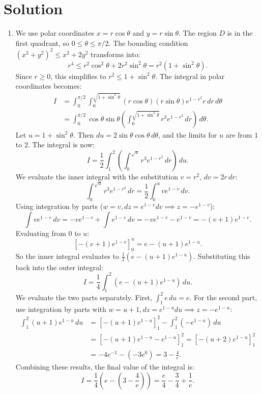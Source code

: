 \documentclass{article}
\begin{document}
\section*{Solution}
\begin{enumerate}[label=\fbox{\arabic*}]
  \item %
        We use polar coordinates $x = r \cos \theta$ and $y = r \sin \theta$. 
        The region $D$ is in the first quadrant, so $0 \le \theta \le \pi/2$.
        The bounding condition $(x^2 + y^2)^2 \le x^2 + 2y^2$ transforms into:
        \[
          r^4 \le r^2 \cos^2 \theta + 2r^2 \sin^2 \theta = r^2 (1 + \sin^2 \theta).
        \]
        Since $r \ge 0$, this simplifies to $r^2 \le 1 + \sin^2 \theta$.
        The integral in polar coordinates becomes:
        \begin{align*}
          I &= \int_0^{\pi/2} \int_0^{\sqrt{1+\sin^2\theta}} (r\cos\theta)(r\sin\theta) e^{1-r^2} r \, dr \, d\theta \\
          &= \int_0^{\pi/2} \cos\theta \sin\theta \left( \int_0^{\sqrt{1+\sin^2\theta}} r^3 e^{1-r^2} \, dr \right) \, d\theta.
        \end{align*}
        Let $u = 1 + \sin^2\theta$. Then $du = 2 \sin\theta \cos\theta \, d\theta$, and the limits for $u$ are from $1$ to $2$.
        The integral is now:
        \[
          I = \frac{1}{2} \int_1^2 \left( \int_0^{\sqrt{u}} r^3 e^{1-r^2} \, dr \right) \, du.
        \]
        We evaluate the inner integral with the substitution $v = r^2$, $dv = 2r \, dr$:
        \[
          \int_0^{\sqrt{u}} r^3 e^{1-r^2} \, dr = \frac{1}{2} \int_0^u v e^{1-v} \, dv.
        \]
        Using integration by parts ($w = v, dz = e^{1-v}dv \implies z = -e^{1-v}$):
        \[
          \int v e^{1-v} \, dv = -v e^{1-v} + \int e^{1-v} \, dv = -v e^{1-v} - e^{1-v} = -(v+1)e^{1-v}.
        \]
        Evaluating from $0$ to $u$:
        \[
          \left[ -(v+1)e^{1-v} \right]_0^u = e - (u+1)e^{1-u}.
        \]
        So the inner integral evaluates to $\frac{1}{2} (e - (u+1)e^{1-u})$. 
        Substituting this back into the outer integral:
        \[
          I = \frac{1}{4} \int_1^2 \left( e - (u+1)e^{1-u} \right) \, du.
        \]
        We evaluate the two parts separately. First, $\int_1^2 e \, du = e$. 
        For the second part, use integration by parts with $w = u+1, dz = e^{1-u}du \implies z = -e^{1-u}$:
        \begin{align*}
          \int_1^2 (u+1)e^{1-u} \, du &= \left[ -(u+1)e^{1-u} \right]_1^2 - \int_1^2 (-e^{1-u}) \, du \\
          &= \left[ -(u+1)e^{1-u} - e^{1-u} \right]_1^2 = \left[ -(u+2)e^{1-u} \right]_1^2 \\
          &= -4e^{-1} - (-3e^0) = 3 - \frac{4}{e}.
        \end{align*}
        Combining these results, the final value of the integral is:
        \[
          I = \frac{1}{4} \left( e - \left( 3 - \frac{4}{e} \right) \right) = \frac{e}{4} - \frac{3}{4} + \frac{1}{e}.
        \]


\end{enumerate}
\end{document}
